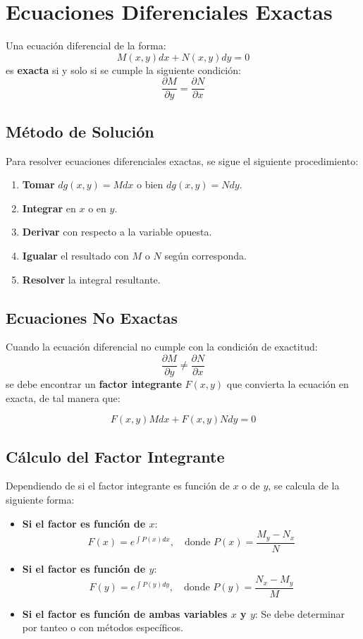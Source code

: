 \section{Ecuaciones Diferenciales Exactas}

Una ecuación diferencial de la forma:
\[
M(x,y)dx + N(x,y)dy = 0
\]
es \textbf{exacta} si y solo si se cumple la siguiente condición:
\[
\frac{\partial M}{\partial y} = \frac{\partial N}{\partial x}
\]

\subsection*{Método de Solución}

Para resolver ecuaciones diferenciales exactas, se sigue el siguiente procedimiento:

\begin{enumerate}
    \item \textbf{Tomar} \( dg(x,y) = Mdx \) o bien \( dg(x,y) = Ndy \).
    \item \textbf{Integrar} en \( x \) o en \( y \).
    \item \textbf{Derivar} con respecto a la variable opuesta.
    \item \textbf{Igualar} el resultado con \( M \) o \( N \) según corresponda.
    \item \textbf{Resolver} la integral resultante.
\end{enumerate}

\subsection*{Ecuaciones No Exactas}

Cuando la ecuación diferencial no cumple con la condición de exactitud:
\[
\frac{\partial M}{\partial y} \neq \frac{\partial N}{\partial x}
\]
se debe encontrar un \textbf{factor integrante} \( F(x,y) \) que convierta la ecuación en exacta, de tal manera que:

\[
F(x,y) Mdx + F(x,y) Ndy = 0
\]

\subsection*{Cálculo del Factor Integrante}

Dependiendo de si el factor integrante es función de \( x \) o de \( y \), se calcula de la siguiente forma:

\begin{itemize}
    \item \textbf{Si el factor es función de \( x \)}:
    \[
    F(x) = e^{\int P(x) dx}, \quad \text{donde } P(x) = \frac{M_y - N_x}{N}
    \]
    
    \item \textbf{Si el factor es función de \( y \)}:
    \[
    F(y) = e^{\int P(y) dy}, \quad \text{donde } P(y) = \frac{N_x - M_y}{M}
    \]

    \item \textbf{Si el factor es función de ambas variables \( x \) y \( y \)}:  
    Se debe determinar por tanteo o con métodos específicos.
\end{itemize}

